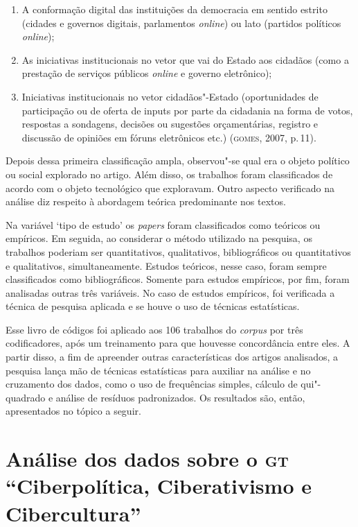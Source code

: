 \begin{enumerate}
\item  A conformação digital das instituições da democracia em sentido estrito (cidades e governos digitais, parlamentos \emph{online}) ou lato (partidos políticos \emph{online});
\item As iniciativas institucionais no vetor que vai do Estado aos cidadãos (como a prestação de serviços públicos \emph{online} e governo eletrônico);
\item Iniciativas institucionais no vetor cidadãos"-Estado (oportunidades de participação ou de oferta de inputs por parte da cidadania na forma de votos, respostas a sondagens, decisões ou sugestões orçamentárias, registro e discussão de opiniões em fóruns eletrônicos etc.) (\textsc{gomes}, 2007, p.\,11).
\end{enumerate}

Depois dessa primeira classificação ampla, observou"-se qual era o objeto
político ou social explorado no artigo. Além disso, os trabalhos foram
classificados de acordo com o objeto tecnológico que exploravam. Outro
aspecto verificado na análise diz respeito à abordagem teórica
predominante nos textos.

Na variável `tipo de estudo' os \emph{papers} foram classificados como
teóricos ou empíricos. Em seguida, ao considerar o método utilizado na
pesquisa, os trabalhos poderiam ser quantitativos, qualitativos,
bibliográficos ou quantitativos e qualitativos, simultaneamente. Estudos
teóricos, nesse caso, foram sempre classificados como bibliográficos.
Somente para estudos empíricos, por fim, foram analisadas outras três
variáveis. No caso de estudos empíricos, foi verificada a técnica de
pesquisa aplicada e se houve o uso de técnicas estatísticas.

Esse livro de códigos foi aplicado aos 106 trabalhos do \emph{corpus}
por três codificadores, após um treinamento para que houvesse
concordância entre eles. A partir disso, a fim de apreender outras
características dos artigos analisados, a pesquisa lança mão de técnicas
estatísticas para auxiliar na análise e no cruzamento dos dados, como o
uso de frequências simples, cálculo de qui"-quadrado e análise de
resíduos padronizados. Os resultados são, então, apresentados no tópico
a seguir.

\section{Análise dos dados sobre o \textsc{gt} ``Ciberpolítica, Ciberativismo e
Cibercultura''}

